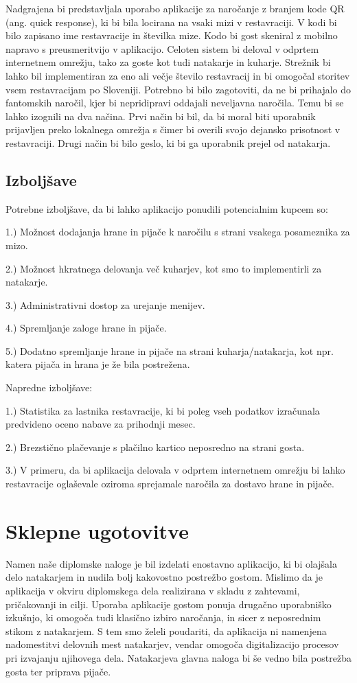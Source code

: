 \documentclass[a4paper, 12pt]{book}
\begin{document}
Nadgrajena bi predstavljala uporabo aplikacije za naročanje z branjem kode QR (ang. quick response), ki bi bila locirana na vsaki mizi v restavraciji. V kodi bi bilo zapisano ime restavracije in številka mize. Kodo bi gost skeniral z mobilno napravo s preusmeritvijo v aplikacijo. Celoten sistem bi deloval v odprtem internetnem omrežju, tako za goste kot tudi natakarje in kuharje. Strežnik bi lahko bil implementiran za eno ali večje število restavracij in bi omogočal storitev vsem restavracijam po Sloveniji. Potrebno bi bilo zagotoviti, da ne bi prihajalo do fantomskih naročil, kjer bi nepridipravi oddajali neveljavna naročila. Temu bi se lahko izognili na dva načina. Prvi način bi bil, da bi moral biti uporabnik prijavljen preko lokalnega omrežja s čimer bi overili svojo dejansko prisotnost v restavraciji.
Drugi način bi bilo geslo, ki bi ga uporabnik prejel od natakarja. 


\section{Izboljšave}

Potrebne izboljšave, da bi lahko aplikacijo ponudili potencialnim kupcem so:

1.) Možnost dodajanja hrane in pijače k naročilu s strani vsakega posameznika za mizo.

2.) Možnost hkratnega delovanja več kuharjev, kot smo to implementirli za natakarje.

3.) Administrativni dostop za urejanje menijev.

4.) Spremljanje zaloge hrane in pijače.

5.) Dodatno spremljanje hrane in pijače na strani kuharja/natakarja, kot npr. katera pijača in hrana je že bila postrežena.


Napredne izboljšave: 

1.) Statistika za lastnika restavracije, ki bi poleg vseh podatkov izračunala predvideno oceno nabave za prihodnji mesec.

2.) Brezstično plačevanje s plačilno kartico neposredno na strani gosta.

3.) V primeru, da bi aplikacija delovala v odprtem internetnem omrežju bi lahko restavracije oglaševale oziroma sprejamale naročila za dostavo hrane in pijače.


\chapter {Sklepne ugotovitve}
Namen naše diplomske naloge je bil izdelati enostavno aplikacijo, ki bi olajšala delo natakarjem in nudila bolj kakovostno postrežbo gostom. Mislimo da je aplikacija v okviru diplomskega dela realizirana v skladu z zahtevami, pričakovanji in cilji. Uporaba aplikacije gostom ponuja drugačno uporabniško izkušnjo, ki omogoča tudi klasično izbiro naročanja, in sicer z neposrednim stikom z natakarjem. S tem smo želeli poudariti, da aplikacija ni namenjena nadomestitvi delovnih mest natakarjev, vendar omogoča digitalizacijo procesov pri izvajanju njihovega dela. Natakarjeva glavna naloga bi še vedno bila postrežba gosta ter priprava pijače. 
\end{document}
